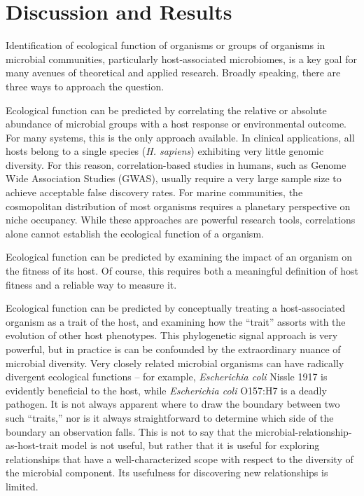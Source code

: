 \section{Discussion and Results}

Identification of ecological function of organisms or groups of organisms in microbial communities, particularly host-associated microbiomes, is a key goal for many avenues of theoretical and applied research. Broadly speaking, there are three ways to approach the question.

Ecological function can be predicted by correlating the relative or absolute abundance of microbial groups with a host response or environmental outcome. For many systems, this is the only approach available. In clinical applications, all hosts belong to a single species ({\em H. sapiens}) exhibiting very little genomic diversity. For this reason, correlation-based studies in humans, such as Genome Wide Association Studies (GWAS), usually require a very large sample size to achieve acceptable false discovery rates. \cite{pearson2008interpret} For marine communities, the cosmopolitan distribution of most organisms requires a planetary perspective on niche occupancy. \cite{jiang2012functional,violle2014emergence} While these approaches are powerful research tools, correlations alone cannot establish the ecological function of a organism. 

Ecological function can be predicted by examining the impact of an organism on the fitness of its host. Of course, this requires both a meaningful definition of host fitness and a reliable way to measure it. \cite{kutzer2016maximising,rynkiewicz2015ecosystem}

Ecological function can be predicted by conceptually treating a host-associated organism as a trait of the host, and examining how the ``trait'' assorts with the evolution of other host phenotypes. \cite{easson2014phylogenetic,schottner2013relationships} This phylogenetic signal approach \cite{felsenstein1985phylogenies,revell2008phylogenetic,munkemuller2012measure} is very powerful, but in practice is can be confounded by the extraordinary nuance of microbial diversity. Very closely related microbial organisms can have radically divergent ecological functions -- for example, {\em Escherichia coli} Nissle 1917 is evidently beneficial to the host, \cite{gronbach2010safety} while {\em Escherichia coli} O157:H7 is a deadly pathogen. \cite{gally2017microbe} It is not always apparent where to draw the boundary between two such ``traits,'' nor is it always straightforward to determine which side of the boundary an observation falls. This is not to say that the microbial-relationship-as-host-trait model is not useful, but rather that it is useful for exploring relationships that have a well-characterized scope with respect to the diversity of the microbial component. Its usefulness for discovering new relationships is limited. 

